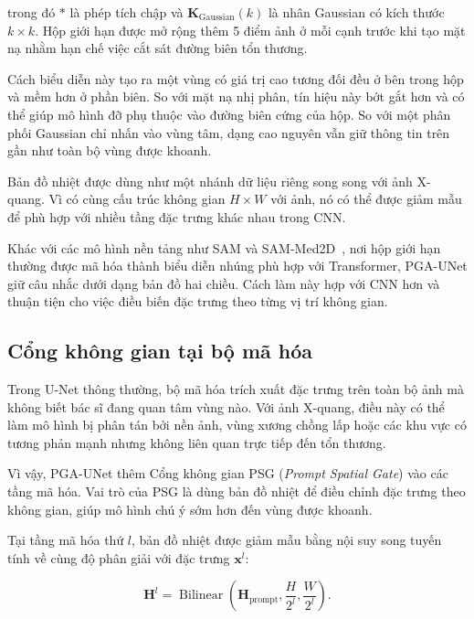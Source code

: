 trong đó $\ast$ là phép tích chập và
$\mathbf{K}_{\mathrm{Gaussian}}(k)$ là nhân Gaussian có kích thước $k\times k$. Hộp giới hạn được mở rộng thêm 5 điểm ảnh ở mỗi cạnh trước khi tạo mặt nạ nhằm hạn chế việc cắt sát đường biên tổn thương.

Cách biểu diễn này tạo ra một vùng có giá trị cao tương đối đều ở bên trong hộp và mềm hơn ở phần biên. So với mặt nạ nhị phân, tín hiệu này bớt gắt hơn và có thể giúp mô hình đỡ phụ thuộc vào đường biên cứng của hộp. So với một phân phối Gaussian chỉ nhấn vào vùng tâm, dạng cao nguyên vẫn giữ thông tin trên gần như toàn bộ vùng được khoanh.

Bản đồ nhiệt được dùng như một nhánh dữ liệu riêng song song với ảnh X-quang. Vì có cùng cấu trúc không gian $H\times W$ với ảnh, nó có thể được giảm mẫu để phù hợp với nhiều tầng đặc trưng khác nhau trong CNN.

Khác với các mô hình nền tảng như SAM và SAM-Med2D~\cite{2023-SAM-Kirillov,2023-SAMMed2D-Cheng}, nơi hộp giới hạn thường được mã hóa thành biểu diễn nhúng phù hợp với Transformer, PGA-UNet giữ câu nhắc dưới dạng bản đồ hai chiều. Cách làm này hợp với CNN hơn và thuận tiện cho việc điều biến đặc trưng theo từng vị trí không gian.

\subsection{Cổng không gian tại bộ mã hóa}
\label{subsec:psg}

Trong U-Net thông thường, bộ mã hóa trích xuất đặc trưng trên toàn bộ ảnh mà không biết bác sĩ đang quan tâm vùng nào. Với ảnh X-quang, điều này có thể làm mô hình bị phân tán bởi nền ảnh, vùng xương chồng lấp hoặc các khu vực có tương phản mạnh nhưng không liên quan trực tiếp đến tổn thương.

Vì vậy, PGA-UNet thêm Cổng không gian PSG (\textit{Prompt Spatial Gate}) vào các tầng mã hóa. Vai trò của PSG là dùng bản đồ nhiệt để điều chỉnh đặc trưng theo không gian, giúp mô hình chú ý sớm hơn đến vùng được khoanh.

Tại tầng mã hóa thứ $l$, bản đồ nhiệt được giảm mẫu bằng nội suy song tuyến tính về cùng độ phân giải với đặc trưng $\mathbf{x}^{l}$:

\begin{equation}
    \mathbf{H}^{l}
    =
    \operatorname{Bilinear}
    \left(
        \mathbf{H}_{\mathrm{prompt}},
        \frac{H}{2^{l}},
        \frac{W}{2^{l}}
    \right).
    \label{eq:psg_downsample}
\end{equation}


